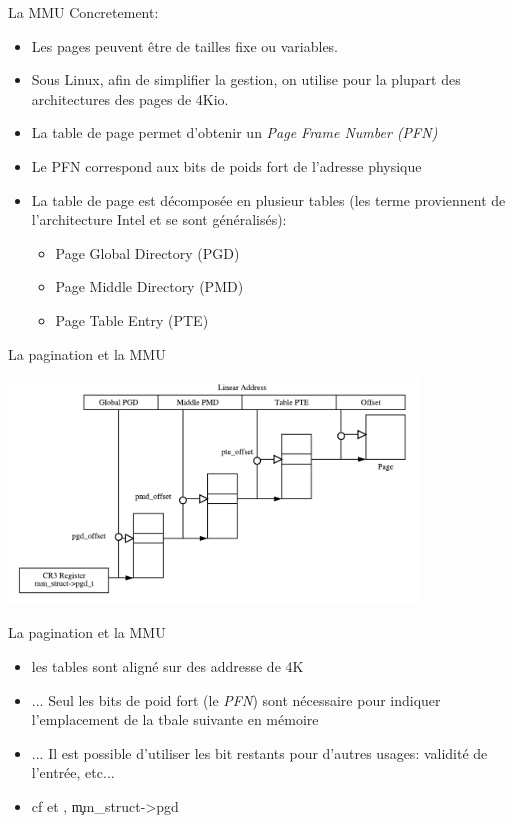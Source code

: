 \begin{frame}{La MMU}
Concretement:
  \begin{itemize}
    \item Les pages peuvent être de tailles fixe ou variables.
    \item Sous Linux,  afin de simplifier la gestion,  on utilise pour
      la plupart des architectures des pages de 4Kio.
    \item La table de page permet d'obtenir un \emph{Page Frame Number (PFN)}
    \item Le PFN correspond aux bits de poids fort de l'adresse physique
    \item  La table  de page  est décomposée  en plusieur  tables (les
      terme   proviennent   de  l'architecture   Intel   et  se   sont
      généralisés):
      \begin{itemize}
      \item Page Global Directory (PGD)
      \item Page Middle Directory (PMD)
      \item Page Table Entry (PTE)
      \end{itemize}
    \end{itemize}
\end{frame}

\begin{frame}{La pagination et la MMU}
  \begin{center}
    \includegraphics[height=6cm]{pics/linearaddress}
  \end{center}
\end{frame}

\begin{frame}{La pagination et la MMU}
  \begin{itemize}
      \item les tables sont aligné sur des addresse de 4K
      \item  ... Seul  les  bits  de poid  fort  (le \emph{PFN})  sont
        nécessaire pour indiquer l'emplacement de la tbale suivante en
        mémoire
      \item  ... Il  est  possible d'utiliser  les  bit restants  pour
        d'autres usages: validité de l'entrée, etc...
      \item          cf                    et
        , \c{mm_struct->pgd}
    \end{itemize}
\end{frame}
    
